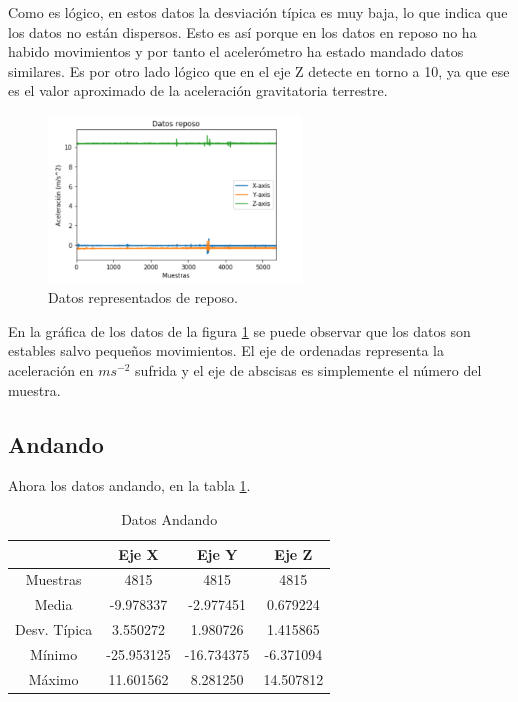 \documentclass[12pt]{book}
\numberwithin{equation}{section}
\begin{document}
Como es lógico, en estos datos la desviación típica es muy baja, lo que indica que los datos no están dispersos. Esto es así porque en los datos en reposo no ha habido movimientos y por tanto el acelerómetro ha estado mandado datos similares. Es por otro lado lógico que en el eje Z detecte en torno a 10, ya que ese es el valor aproximado de la aceleración gravitatoria terrestre.

\begin{figure}[h]
    \centering
    \includegraphics[width=0.6\textwidth]{reposodatos.png}
    \caption{Datos representados de reposo.}
    \label{fig:reposodatos}
\end{figure}

En la gráfica de los datos de la figura \ref{fig:reposodatos} se puede observar que los datos son estables salvo pequeños movimientos. El eje de ordenadas representa la aceleración en $m s^{-2}$ sufrida y el eje de abscisas es simplemente el número del muestra.

\newpage
\subsection{Andando}

Ahora los datos andando, en la tabla \ref{tabla4}.

\begin{table}[h]
\centering
\caption{Datos Andando}
\begin{tabular}{| c | c | c | c |}
\hline
 & Eje X & Eje Y & Eje Z \\
\hline
Muestras & 4815 & 4815 & 4815 \\
\hline
Media & -9.978337 & -2.977451 & 0.679224 \\
\hline
Desv. Típica & 3.550272 & 1.980726 & 1.415865 \\
\hline
Mínimo & -25.953125 & -16.734375 & -6.371094 \\
\hline
Máximo & 11.601562 & 8.281250 & 14.507812 \\
\hline
\end{tabular}
\label{tabla4}
\end{table}
\end{document}
